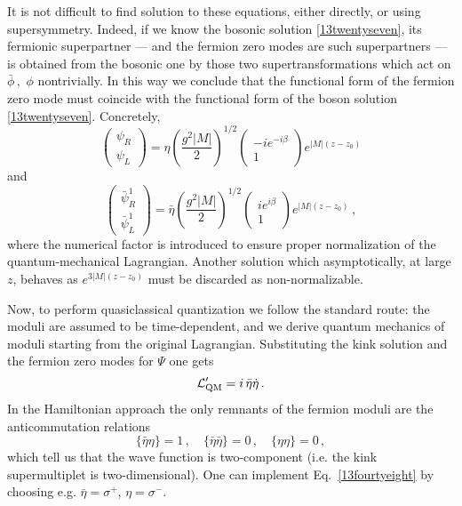 \documentclass[epsfig,12pt]{article}
\def\beq{\begin{equation}}
\def\eeq{\end{equation}}
\def\beq{\begin{equation}}
\def\eeq{\end{equation}}
\begin{document}
	It is not difficult to find solution to these 
	equations, either directly, or using supersymmetry.
	Indeed, if we know the bosonic solution \eqref{13twentyseven},
	its fermionic superpartner --- and the fermion zero modes are such 
	 superpartners --- is obtained from the
	bosonic one by those two supertransformations which act on
	$\bar\phi\,,\,\,\phi$ nontrivially.
	In this way we conclude that the
	  functional form of the fermion zero mode 
	must coincide  with the functional form of the boson  
	  solution \eqref{13twentyseven}. 
	Concretely,
\beq
\left(\begin{array}{c}
\psi_R\\  \psi_L
\end{array}
\right)=\eta 
\left(\frac{g^2|M|}{2}\right)^{1/2}
\left(\begin{array}{c}
-ie^{-i\beta}\\   1
\end{array}
\right)e^{|M|(z-z_0)}
\label{13fourtyfive}
\eeq
	and
 \beq
\left(\begin{array}{c}
\bar \psi_R^1\\  \bar \psi_L^1
\end{array}
\right)=\bar\eta \left(\frac{g^2|M|}{2}\right)^{1/2} \left(\begin{array}{c}
ie^{ i\beta}\\   1
\end{array}
\right)e^{|M|(z-z_0)}\,,
\label{13fourtysix}
\eeq
	where the numerical factor is introduced to ensure proper
	normalization of the quantum-mechanical Lagrangian.
	Another solution which asymptotically, at large $z$, behaves
	as $e^{3|M|(z-z_0)}$ must be discarded as non-normalizable.

	Now, to
	perform   quasiclassical quantization we follow the standard route:
	the moduli are assumed to be   time-dependent, and we derive 
	quantum mechanics of moduli starting from the original Lagrangian.
	Substituting the kink solution and the fermion zero modes for
	$\Psi$ one gets
\beq
{\cal L}'_{\rm QM} = i\, \bar\eta\dot\eta\,.
\label{13fourtyseven}
\eeq
	In the Hamiltonian approach the only remnants of the fermion moduli
	are the anticommutation relations
\beq
\{\bar\eta\eta\} =1\,,\quad \{\bar\eta \bar\eta\} =0\,,\quad \{\eta \eta\} =0\,,
\label{13fourtyeight}
\eeq
	which tell us that the wave function is two-component
	(i.e. the kink supermultiplet is two-dimensional). One can implement
	Eq.~\eqref{13fourtyeight} by choosing e.g. 
	$\bar\eta=\sigma^+$, $ \eta=\sigma^-$.
\end{document}
